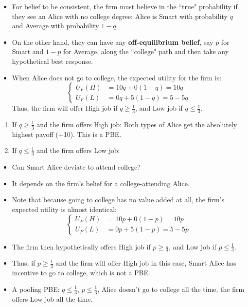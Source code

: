 \documentclass[notitlepage]{article}
\begin{document}
\begin{itemize}
\begin{enumerate}
\begin{itemize}
            \((Average, College)\}\) and \(\{(Smart, No College), (Average, No College)\}\), the firm should have two sets of beliefs.
            \item For belief to be consistent, the firm must believe in the ``true" probability if they see an Alice with no college degree: Alice is Smart with probability \(q\) and Average with probability \(1-q\).
            \item On the other hand, they can have any \textbf{off-equilibrium belief}, say \(p\) for Smart and \(1-p\) for Average, along the ``college" path and then take any hypothetical best response.
            \item When Alice does not go to college, the expected utility for the firm is:
            \[
            \begin{cases}
                U_F(H) &= 10q + 0(1-q) = 10q \\
                U_F(L) &= 0q + 5(1-q) = 5-5q
            \end{cases}
            \]
            Thus, the firm will offer High job if \(q \ge \frac{1}{3}\), and Low job if \(q \le \frac{1}{3}\).
        \end{itemize}
        \begin{enumerate}
            \item If \(q \ge \frac{1}{3}\) and the firm offers High job: Both types of Alice get the absolutely highest payoff (+10). This is a PBE.
            \item If \(q \le \frac{1}{3}\) and the firm offers Low job: 
        \end{enumerate}
        \begin{itemize}
            \item Can Smart Alice deviate to attend college?
            \item It depends on the firm's belief for a college-attending Alice.
            \item Note that because going to college has no value added at all, the firm's expected utility is almost identical:
            \[
            \begin{cases}
                U_F(H) &= 10p + 0(1-p) = 10p \\
                U_F(L) &= 0p + 5(1-p) = 5-5p
            \end{cases}
            \]
            \item The firm then hypothetically offers High job if \(p \ge \frac{1}{3}\), and Low job if \(p \le \frac{1}{3}\).
            \item Thus, if \(p \ge \frac{1}{3}\) and the firm will offer High job in this case, Smart Alice has incentive to go to college, which is not a PBE.
            \item A pooling PBE: \(q \le \frac{1}{3}\), \(p \le \frac{1}{3}\), Alice doesn't go to college all the time, the firm offers Low job all the time.
        \end{itemize}
    \end{enumerate}


\end{itemize}
\end{document}
